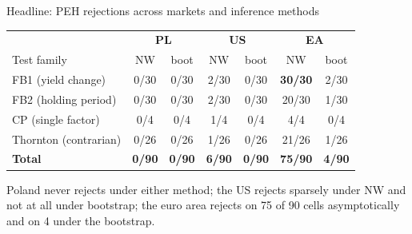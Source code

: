 \documentclass[aspectratio=169,11pt]{beamer}
\begin{document}
\begin{frame}{Headline: PEH rejections across markets and inference methods}
  \begin{center}
  \small
  \begin{tabular}{lcccccc}
    & \multicolumn{2}{c}{\textbf{PL}} & \multicolumn{2}{c}{\textbf{US}} & \multicolumn{2}{c}{\textbf{EA}}\\
    Test family & NW & boot & NW & boot & NW & boot\\
    \hline
    FB1 (yield change)      & 0/30 & 0/30 & 2/30 & 0/30 & \textcolor{ycsalmon}{\textbf{30/30}} & 2/30\\
    FB2 (holding period)    & 0/30 & 0/30 & 2/30 & 0/30 & 20/30 & 1/30\\
    CP (single factor)      & 0/4  & 0/4  & 1/4  & 0/4  & 4/4   & 0/4\\
    Thornton (contrarian)   & 0/26 & 0/26 & 1/26 & 0/26 & 21/26 & 1/26\\
    \hline
    \textbf{Total}          & \textbf{0/90} & \textbf{0/90} & \textbf{6/90} & \textbf{0/90}
                            & \textcolor{ycsalmon}{\textbf{75/90}} & \textbf{4/90}\\
  \end{tabular}
  \end{center}
  \vspace{2mm}
  \footnotesize\color{ycmuted} Poland never rejects under either method; the US
  rejects sparsely under NW and not at all under bootstrap; the euro area
  rejects on 75 of 90 cells asymptotically and on 4 under the bootstrap.
\end{frame}
\end{document}
